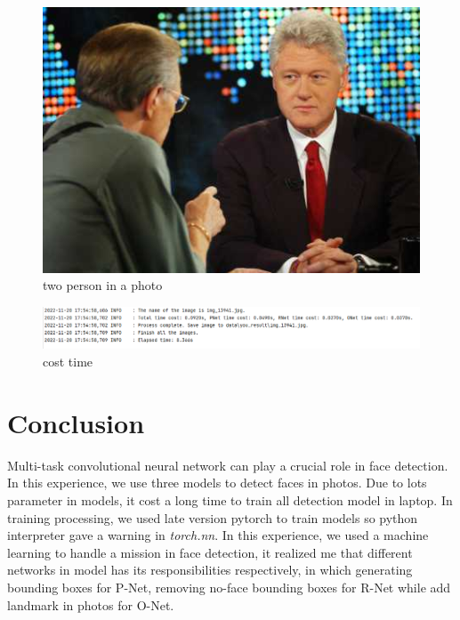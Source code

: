 \documentclass[journal, a4paper]{IEEEtran}
\begin{document}
	\begin{figure}
		\begin{center}
		\includegraphics[width=\columnwidth]{images/img_13869.jpg}
		\caption{two person in a photo}
		\label{fig:13869_raw}
		\end{center}
	\end{figure}
	\begin{figure}
		\begin{center}
		\includegraphics[width=\columnwidth]{images/cost.png}
		\caption{cost time}
		\label{fig:cost}
		\end{center}
	\end{figure}

\section{Conclusion}
	Multi-task convolutional neural network can play a crucial role in face detection. In this experience, we use three models to detect faces in photos. Due to lots parameter in models, it cost a long time to train all detection model in laptop. In training processing, we used late version pytorch to train models so python interpreter gave a warning in \textit{torch.nn}. In this experience, we used a machine learning to handle a mission in face detection, it realized me that different networks in model has its responsibilities respectively, in which generating bounding boxes for P-Net, removing no-face bounding boxes for R-Net while add landmark in photos for O-Net.
	
\end{document}

